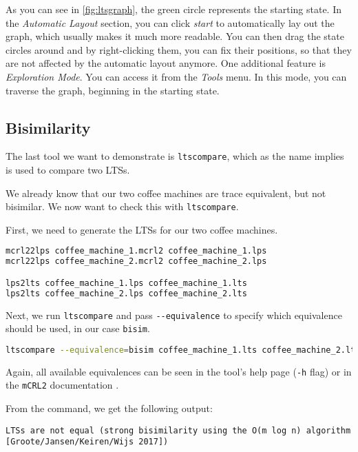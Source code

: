 \documentclass{clseminar}
\begin{document}
  As you can see in \autoref{fig:ltsgraph}, the green circle represents the starting state. In the \textit{Automatic Layout} section, you can click \textit{start} to automatically lay out the graph, which usually makes it much more readable. You can then drag the state circles around and by right-clicking them, you can fix their positions, so that they are not affected by the automatic layout anymore. One additional feature is \textit{Exploration Mode}. You can access it from the \textit{Tools} menu. In this mode, you can traverse the graph, beginning in the starting state.

  \subsection{Bisimilarity}

  The last tool we want to demonstrate is \texttt{ltscompare}, which as the name implies is used to compare two LTSs.

  We already know that our two coffee machines are trace equivalent, but not bisimilar. We now want to check this with \texttt{ltscompare}.

  First, we need to generate the LTSs for our two coffee machines.

  \begin{lstlisting}[language=Bash]
mcrl22lps coffee_machine_1.mcrl2 coffee_machine_1.lps
mcrl22lps coffee_machine_2.mcrl2 coffee_machine_2.lps

lps2lts coffee_machine_1.lps coffee_machine_1.lts
lps2lts coffee_machine_2.lps coffee_machine_2.lts
  \end{lstlisting}

  Next, we run \texttt{ltscompare} and pass \texttt{-{}-equivalence} to specify which equivalence should be used, in our case \texttt{bisim}.

  \begin{lstlisting}[language=Bash]
ltscompare --equivalence=bisim coffee_machine_1.lts coffee_machine_2.lts
  \end{lstlisting}

  Again, all available equivalences can be seen in the tool's help page (\texttt{-h} flag) or in the \texttt{mCRL2} documentation \cite{mcrl2doc}.

  From the command, we get the following output:

  \begin{lstlisting}
LTSs are not equal (strong bisimilarity using the O(m log n) algorithm [Groote/Jansen/Keiren/Wijs 2017])
  \end{lstlisting}
\end{document}
